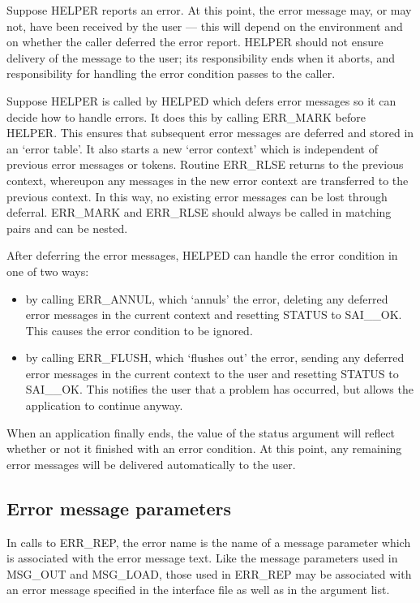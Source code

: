 Suppose HELPER reports an error.
At this point, the error message may, or may not, have been received by the
user --- this will depend on the environment and on whether the caller deferred
the error report.
HELPER should not ensure delivery of the message to the user; its
responsibility ends when it aborts, and responsibility for handling the error
condition passes to the caller.

Suppose HELPER is called by HELPED which defers error messages so it can decide
how to handle errors.
It does this by calling ERR\_MARK before HELPER.
This ensures that subsequent error messages are deferred and stored in an
`error table'.
It also starts a new `error context' which is independent of previous error
messages or tokens.
Routine ERR\_RLSE returns to the previous context, whereupon any messages in
the new error context are transferred to the previous context.
In this way, no existing error messages can be lost through deferral.
ERR\_MARK and ERR\_RLSE should always be called in matching pairs and can
be nested.

After deferring the error messages, HELPED can handle the error condition
in one of two ways:

\begin {itemize}
\item by calling ERR\_ANNUL, which `annuls' the error, deleting any deferred
 error messages in the current context and resetting STATUS to SAI\_\_OK.
 This causes the error condition to be ignored.
\item by calling ERR\_FLUSH, which `flushes out' the error, sending any
 deferred error messages in the current context to the user and
 resetting STATUS to SAI\_\_OK.
 This notifies the user that a problem has occurred, but allows the
 application to continue anyway.
\end{itemize}

When an application finally ends, the value of the status argument will
reflect whether or not it finished with an error condition.
At this point, any remaining error messages will be delivered automatically
to the user.

\subsection {Error message parameters}

In calls to ERR\_REP, the error name is the name of a
message parameter which is associated with the error message text.
Like the message parameters used in MSG\_OUT and MSG\_LOAD, those used in
ERR\_REP may be associated with an error message specified in the interface
file as well as in the argument list.
